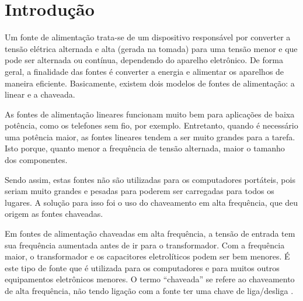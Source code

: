 \documentclass[a4paper,12pt,oneside,openany,table,xcdraw]{article}
\begin{document}
\newcommand{\thedepartment}{Faculdade de Engenharia Elétrica}
\newcommand{\thecourse}{FEELT}
\newcommand{\thetitle}{FONTE DE ALIMENTAÇÃO LINEAR REGULADA}
\newcommand{\thetype}{Relatório da Disciplina de Eletrônica Analógica I}
\newcommand{\theproftitle}{Bacharel em Engenharia Elétrica}
\newcommand{\thestudent}{Ana Júlia Costa Santana \_ 
11811ETE003\\Lesly Viviane Montúfar Berrios \_ 
11811ETE001}
\newcommand{\theadvisor}{Prof. Daniel Pereira de Carvalho}
\newcommand{\thecity}{Uberlândia}

\thispagestyle{empty}


\onehalfspacing
\tableofcontents %
\newpage

\section{Introdução}
Um fonte de alimentação
trata-se de um dispositivo responsável por converter a tensão elétrica alternada e alta (gerada na tomada) para uma tensão menor e que pode ser alternada ou contínua, dependendo do aparelho eletrônico.
De forma geral, a finalidade das fontes é converter a energia e alimentar os aparelhos de maneira eficiente.
Basicamente, existem dois modelos de fontes de alimentação: a linear e a chaveada.

As fontes de alimentação lineares funcionam muito bem para aplicações de baixa potência, como os telefones sem fio, por exemplo. Entretanto, quando é necessário uma potência maior, as fontes lineares tendem a ser muito grandes para a tarefa. Isto porque, quanto menor a frequência de tensão alternada, maior o tamanho dos componentes. 

Sendo assim, estas fontes não são utilizadas para os computadores portáteis, pois seriam muito grandes e pesadas para poderem ser carregadas para todos os lugares. A solução para isso foi o uso do chaveamento em alta frequência, que deu origem as fontes chaveadas.

Em fontes de alimentação chaveadas em alta frequência, a tensão de entrada tem sua frequência aumentada antes de ir para o transformador. Com a frequência maior, o transformador e os capacitores eletrolíticos podem ser bem menores. 
É este tipo de fonte que é utilizada para os computadores e para muitos outros equipamentos eletrônicos menores. O termo “chaveada” se refere ao chaveamento de alta frequência, não tendo ligação com a fonte ter uma chave de liga/desliga \cite{hayama}.
\end{document}
